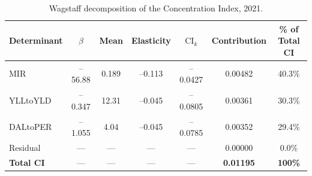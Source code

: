 \documentclass[12pt]{article}
\begin{document}
\clearpage

\begin{table}[htbp]
\centering
\caption{Wagstaff decomposition of the Concentration Index, 2021.}
\label{tab:table5}
\small
\begin{tabular}{lcccccc}
\toprule
Determinant & $\beta$ & Mean & Elasticity & $\text{CI}_k$ & Contribution & \% of Total CI \\
\midrule
MIR & --56.88 & 0.189 & --0.113 & --0.0427 & 0.00482 & 40.3\% \\
YLLtoYLD & --0.347 & 12.31 & --0.045 & --0.0805 & 0.00361 & 30.3\% \\
DALtoPER & --1.055 & 4.04 & --0.045 & --0.0785 & 0.00352 & 29.4\% \\
Residual & --- & --- & --- & --- & 0.00000 & 0.0\% \\
\midrule
\textbf{Total CI} & --- & --- & --- & --- & \textbf{0.01195} & \textbf{100\%} \\
\bottomrule
\end{tabular}
\end{table}

\clearpage

\end{document}
